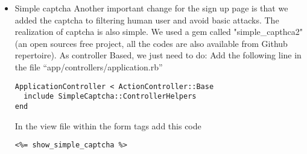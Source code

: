 \begin{enumerate}
\begin{itemize}
\item{Simple captcha}
Another important change for the sign up page is that we added the captcha to filtering human user and avoid basic attacks. The realization of captcha is also simple. We used a gem called "simple\_capthca2"(an open sources free project, all the codes are also available from Github repertoire). 
As controller Based, we just need to do:
Add the following line in the file “app/controllers/application.rb”
\begin{lstlisting}
ApplicationController < ActionController::Base
  include SimpleCaptcha::ControllerHelpers
end
\end{lstlisting}

In the view file within the form tags add this code
\begin{lstlisting}
<%= show_simple_captcha %>
\end{lstlisting}


\end{itemize}
\end{enumerate}
